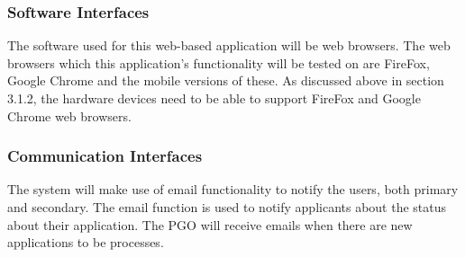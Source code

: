 \documentclass{article}
\begin{document}
\subsubsection{Software Interfaces}
The software used for this web-based application will be web browsers. The web browsers which this application’s functionality will be tested on are FireFox, Google Chrome and the mobile versions of these. As discussed above in section 3.1.2, the hardware devices need to be able to support FireFox and Google Chrome web browsers. 

\subsubsection{Communication Interfaces}
The system will make use of email functionality to notify the users, both primary and secondary. The email function is used to notify applicants about the status about their application. The PGO will receive emails when there are new applications to be processes. 
\end{document}
